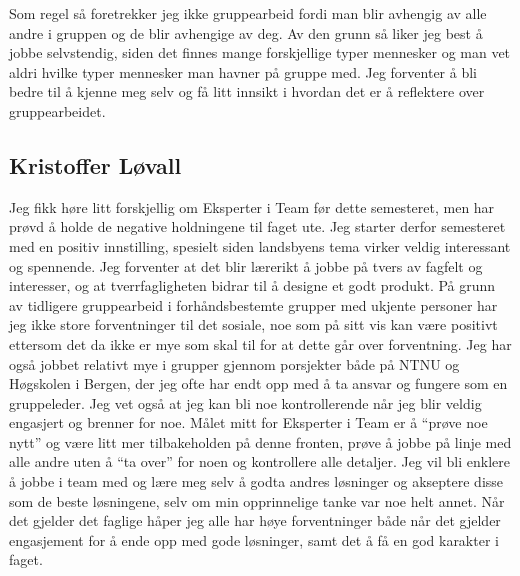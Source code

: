 Som regel så foretrekker jeg ikke gruppearbeid fordi man blir avhengig av alle andre i gruppen og de blir avhengige av deg. 
Av den grunn så liker jeg best å jobbe selvstendig, siden det finnes mange forskjellige typer mennesker og man vet aldri 
hvilke typer mennesker man havner på gruppe med. Jeg forventer å bli bedre til å kjenne meg selv og få litt innsikt i 
hvordan det er å reflektere over gruppearbeidet.

\subsection*{Kristoffer Løvall}
Jeg fikk høre litt forskjellig om Eksperter i Team før dette semesteret, men har 
prøvd å holde de negative holdningene til faget ute. Jeg starter derfor semesteret med en positiv innstilling, spesielt siden landsbyens tema 
virker veldig interessant og spennende. Jeg forventer at det blir lærerikt å 
jobbe på tvers av fagfelt og interesser, og at tverrfagligheten bidrar til å 
designe et godt produkt. På grunn av tidligere gruppearbeid i forhåndsbestemte 
grupper med ukjente personer har jeg ikke store forventninger til det sosiale, 
noe som på sitt vis kan være positivt ettersom det da ikke er mye som skal til 
for at dette går over forventning. Jeg har også jobbet relativt mye i grupper 
gjennom porsjekter både på NTNU og Høgskolen i Bergen, der jeg ofte har endt opp 
med å ta ansvar og fungere som en gruppeleder. Jeg vet også at jeg kan bli noe 
kontrollerende når jeg blir veldig engasjert og brenner for noe.  Målet mitt for 
Eksperter i Team er å ``prøve noe nytt'' og være litt mer tilbakeholden på denne 
fronten, prøve å jobbe på linje med alle andre uten å ``ta over'' for noen og 
kontrollere alle detaljer. Jeg vil bli enklere å jobbe i team med og lære meg 
selv å godta andres løsninger og akseptere disse som de beste løsningene, selv om 
min opprinnelige tanke var noe helt annet. Når det gjelder det faglige håper jeg 
alle har høye forventninger både når det gjelder engasjement for å ende opp med 
gode løsninger, samt det å få en god karakter i faget.

